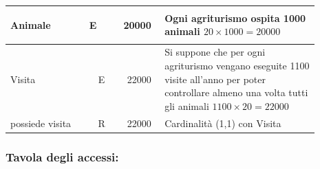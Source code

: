 \documentclass[12pt,a4paper]{article}
\begin{document}
\begin{center}
\begin{longtable}{|p{0.23\linewidth}|p{0.1\linewidth}|p{0.11\linewidth}|p{0.45\linewidth}|}
\hline
Animale 				& \begin{center}
\vspace{-25pt}E
\end{center}
					& \begin{center}
					\vspace{-25pt}20000\end{center}
					&  Ogni agriturismo ospita 1000 animali $20\times 1000=20000$ \\ 

\hline
Visita
 & 
\multicolumn{1}{|c|}{E}
 & 
\multicolumn{1}{|c|}{22000}
 & 
Si suppone che per ogni agriturismo vengano eseguite 1100 visite all'anno per poter controllare almeno una volta tutti gli animali $1100\times 20= 22000$
\\
\hline
possiede visita
 & 
\multicolumn{1}{|c|}{R}
 & 
\multicolumn{1}{|c|}{22000}
 & 
Cardinalità (1,1) con Visita
\\

\hline

\end{longtable}\end{center}
\subsubsection*{Tavola degli accessi:}
\end{document}
